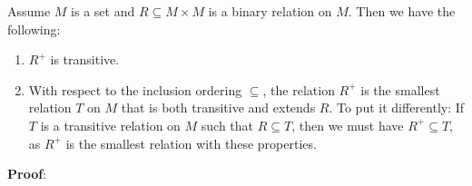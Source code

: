\begin{Proposition}
Assume $M$ is a set  and $R \subseteq M \times M$ is a binary relation on $M$.
Then we have the following:
\begin{enumerate}
\item $R^+$ is transitive.
\item With respect to the inclusion ordering $\subseteq$, the relation $R^+$ 
      is the smallest relation $T$ on  $M$ that is both transitive and extends $R$.
      To put it differently: If $T$ is a transitive relation on $M$ such that $R \subseteq
      T$, then 
      we must have  $R^+ \subseteq T$, as $R^+$ is the smallest relation with these properties.
\end{enumerate}
\end{Proposition}

\noindent
\textbf{Proof}:
